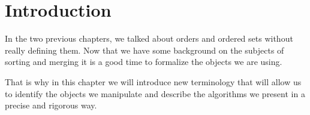 \section{Introduction}


In the two previous chapters, we talked about orders and ordered sets without really defining them. Now that we have some background on the subjects of sorting and merging it is a good time to formalize the objects we are using.

That is why in this chapter we will introduce new terminology that will allow us to identify the objects we manipulate and describe the algorithms we present in a precise and rigorous way.